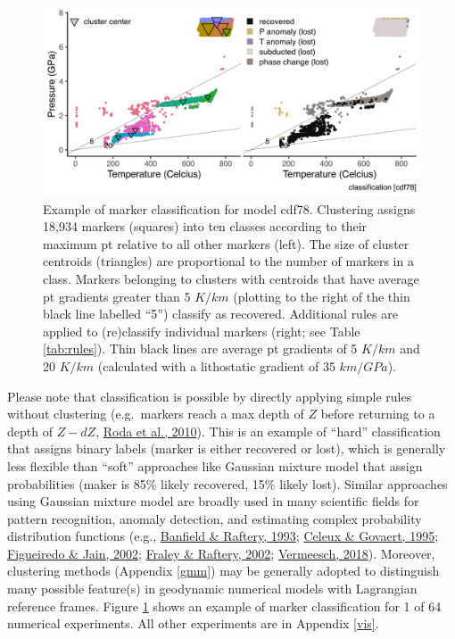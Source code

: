 \begin{figure}[htbp]

{\centering \includegraphics[width=1\linewidth,]{assets/figs/chpt4/k10/cdf78_class} 

}

\caption[Example of marker classification for model cdf78]{Example of marker classification for model cdf78. Clustering assigns 18,934 markers (squares) into ten classes according to their maximum \gls{pt} relative to all other markers (left). The size of cluster centroids (triangles) are proportional to the number of markers in a class. Markers belonging to clusters with centroids that have average \gls{pt} gradients greater than 5 \(K/km\) (plotting to the right of the thin black line labelled ``5'') classify as recovered. Additional rules are applied to (re)classify individual markers (right; see Table \ref{tab:rules}). Thin black lines are average \gls{pt} gradients of 5 \(K/km\) and 20 \(K/km\) (calculated with a lithostatic gradient of 35 \(km/GPa\)).}\label{fig:class}
\end{figure}

Please note that classification is possible by directly applying simple rules without clustering (e.g.~markers reach a max depth of \(Z\) before returning to a depth of \(Z-dZ\), \protect\hyperlink{ref-roda2010}{Roda et al., 2010}). This is an example of ``hard'' classification that assigns binary labels (marker is either recovered or lost), which is generally less flexible than ``soft'' approaches like Gaussian mixture model that assign probabilities (maker is 85\% likely recovered, 15\% likely lost). Similar approaches using Gaussian mixture model are broadly used in many scientific fields for pattern recognition, anomaly detection, and estimating complex probability distribution functions (e.g., \protect\hyperlink{ref-banfield1993}{Banfield \& Raftery, 1993}; \protect\hyperlink{ref-celeux1995}{Celeux \& Govaert, 1995}; \protect\hyperlink{ref-figueiredo2002}{Figueiredo \& Jain, 2002}; \protect\hyperlink{ref-fraley2002}{Fraley \& Raftery, 2002}; \protect\hyperlink{ref-vermeesch2018}{Vermeesch, 2018}). Moreover, clustering methods (Appendix \ref{gmm}) may be generally adopted to distinguish many possible feature(s) in geodynamic numerical models with Lagrangian reference frames. Figure \ref{fig:class} shows an example of marker classification for 1 of 64 numerical experiments. All other experiments are in Appendix \ref{vis}.

